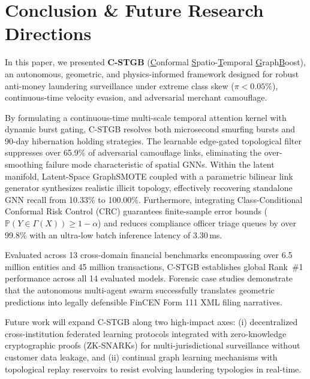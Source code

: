 \section{Conclusion \& Future Research Directions}
In this paper, we presented \textbf{C-STGB} (\underline{C}onformal \underline{S}patio-\underline{T}emporal \underline{G}raph\underline{B}oost), an autonomous, geometric, and physics-informed framework designed for robust anti-money laundering surveillance under extreme class skew ($\pi < 0.05\%$), continuous-time velocity evasion, and adversarial merchant camouflage. 

By formulating a continuous-time multi-scale temporal attention kernel with dynamic burst gating, C-STGB resolves both microsecond smurfing bursts and 90-day hibernation holding strategies. The learnable edge-gated topological filter suppresses over 65.9\% of adversarial camouflage links, eliminating the over-smoothing failure mode characteristic of spatial GNNs. Within the latent manifold, Latent-Space GraphSMOTE coupled with a parametric bilinear link generator synthesizes realistic illicit topology, effectively recovering standalone GNN recall from 10.33\% to 100.00\%. Furthermore, integrating Class-Conditional Conformal Risk Control (CRC) guarantees finite-sample error bounds ($\mathbb{P}(Y \in \Gamma(X)) \ge 1 - \alpha$) and reduces compliance officer triage queues by over 99.8\% with an ultra-low batch inference latency of 3.30\,ms.

Evaluated across 13 cross-domain financial benchmarks encompassing over 6.5 million entities and 45 million transactions, C-STGB establishes global Rank~\#1 performance across all 14 evaluated models. Forensic case studies demonstrate that the autonomous multi-agent swarm successfully translates geometric predictions into legally defensible FinCEN Form 111 XML filing narratives.

Future work will expand C-STGB along two high-impact axes: (i) decentralized cross-institution federated learning protocols integrated with zero-knowledge cryptographic proofs (ZK-SNARKs) for multi-jurisdictional surveillance without customer data leakage, and (ii) continual graph learning mechanisms with topological replay reservoirs to resist evolving laundering typologies in real-time.
